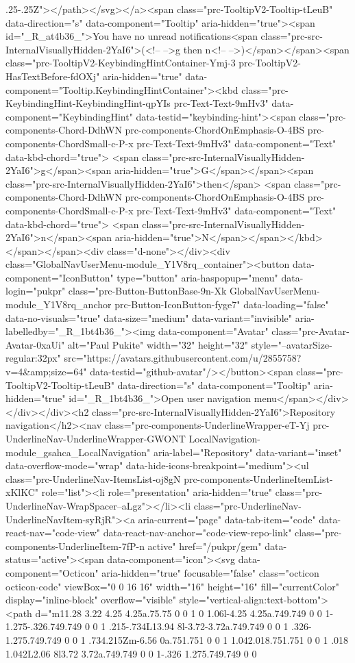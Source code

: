 .25-.25Z"></path></svg></a><span class="prc-TooltipV2-Tooltip-tLeuB" data-direction="s" data-component="Tooltip" aria-hidden="true"><span id="_R_at4b36_">You have no unread notifications<span class="prc-src-InternalVisuallyHidden-2YaI6">(<!-- -->g then n<!-- -->)</span></span><span class="prc-TooltipV2-KeybindingHintContainer-Ymj-3 prc-TooltipV2-HasTextBefore-fdOXj" aria-hidden="true" data-component="Tooltip.KeybindingHintContainer"><kbd class="prc-KeybindingHint-KeybindingHint-qpYIs prc-Text-Text-9mHv3" data-component="KeybindingHint" data-testid="keybinding-hint"><span class="prc-components-Chord-DdhWN prc-components-ChordOnEmphasis-O-4BS prc-components-ChordSmall-c-P-x prc-Text-Text-9mHv3" data-component="Text" data-kbd-chord="true"> <span class="prc-src-InternalVisuallyHidden-2YaI6">g</span><span aria-hidden="true">G</span></span><span class="prc-src-InternalVisuallyHidden-2YaI6">then</span> <span class="prc-components-Chord-DdhWN prc-components-ChordOnEmphasis-O-4BS prc-components-ChordSmall-c-P-x prc-Text-Text-9mHv3" data-component="Text" data-kbd-chord="true"> <span class="prc-src-InternalVisuallyHidden-2YaI6">n</span><span aria-hidden="true">N</span></span></kbd></span></span><div class="d-none"></div><div class="GlobalNavUserMenu-module_Y1V8rq_container"><button data-component="IconButton" type="button" aria-haspopup="menu" data-login="pukpr" class="prc-Button-ButtonBase-9n-Xk GlobalNavUserMenu-module_Y1V8rq_anchor prc-Button-IconButton-fyge7" data-loading="false" data-no-visuals="true" data-size="medium" data-variant="invisible" aria-labelledby="_R_1bt4b36_"><img data-component="Avatar" class="prc-Avatar-Avatar-0xaUi" alt="Paul Pukite" width="32" height="32" style="--avatarSize-regular:32px" src="https://avatars.githubusercontent.com/u/2855758?v=4&amp;size=64" data-testid="github-avatar"/></button><span class="prc-TooltipV2-Tooltip-tLeuB" data-direction="s" data-component="Tooltip" aria-hidden="true" id="_R_1bt4b36_">Open user navigation menu</span></div></div></div><h2 class="prc-src-InternalVisuallyHidden-2YaI6">Repository navigation</h2><nav class="prc-components-UnderlineWrapper-eT-Yj prc-UnderlineNav-UnderlineWrapper-GWONT LocalNavigation-module_gsahca_LocalNavigation" aria-label="Repository" data-variant="inset" data-overflow-mode="wrap" data-hide-icons-breakpoint="medium"><ul class="prc-UnderlineNav-ItemsList-oj8gN prc-components-UnderlineItemList-xKlKC" role="list"><li role="presentation" aria-hidden="true" class="prc-UnderlineNav-WrapSpacer--aLgz"></li><li class="prc-UnderlineNav-UnderlineNavItem-syRjR"><a aria-current="page" data-tab-item="code" data-react-nav="code-view" data-react-nav-anchor="code-view-repo-link" class="prc-components-UnderlineItem-7fP-n active" href="/pukpr/gem" data-status="active"><span data-component="icon"><svg data-component="Octicon" aria-hidden="true" focusable="false" class="octicon octicon-code" viewBox="0 0 16 16" width="16" height="16" fill="currentColor" display="inline-block" overflow="visible" style="vertical-align:text-bottom"><path d="m11.28 3.22 4.25 4.25a.75.75 0 0 1 0 1.06l-4.25 4.25a.749.749 0 0 1-1.275-.326.749.749 0 0 1 .215-.734L13.94 8l-3.72-3.72a.749.749 0 0 1 .326-1.275.749.749 0 0 1 .734.215Zm-6.56 0a.751.751 0 0 1 1.042.018.751.751 0 0 1 .018 1.042L2.06 8l3.72 3.72a.749.749 0 0 1-.326 1.275.749.749 0 0 